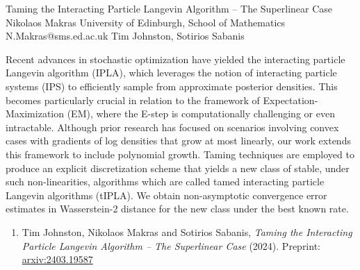 \begin{talk}
  {Taming the Interacting Particle Langevin Algorithm -- The Superlinear Case}%
  {Nikolaos Makras}%
  {University of Edinburgh, School of Mathematics}%
  {N.Makras@sms.ed.ac.uk}%
  {Tim Johnston, Sotirios Sabanis}%
  
    
   
Recent advances in stochastic optimization have yielded the interacting particle Langevin algorithm (IPLA), which leverages the notion of interacting particle systems (IPS) to efficiently sample from approximate posterior densities. This becomes particularly crucial in relation to the framework of Expectation-Maximization (EM), where the E-step is computationally challenging or even intractable. Although prior research has focused on scenarios involving convex cases with gradients of log densities that grow at most linearly, our work extends this framework to include polynomial growth. Taming techniques are employed to produce an explicit discretization scheme that yields a new class of stable, under such non-linearities, algorithms which are called tamed interacting particle Langevin algorithms (tIPLA). We obtain non-asymptotic convergence error estimates in Wasserstein-2 distance for the new class under the best known rate. 

\medskip

\begin{enumerate}
 \item[{[1]}] Tim Johnston, Nikolaos Makras and Sotirios Sabanis, {\it Taming the Interacting Particle Langevin Algorithm -- The Superlinear Case} (2024). Preprint: \href{https://arxiv.org/abs/2403.19587}{arxiv:2403.19587} 
\end{enumerate}

\end{talk}

